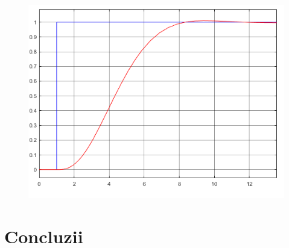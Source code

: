 \documentclass[11pt]{article}
\begin{document}
\begin{figure}[H]
	\centering
	\includegraphics[width=.55\linewidth]{rasp_stare.png}
	\label{fig:test2}
\end{figure}
\newpage


\section{Concluzii}

\newpage

\nocite{*}


\end{document}
